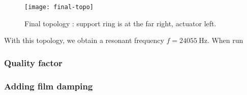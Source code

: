 \begin{figure}[h]
  \begin{center}
    \texttt{[image: final-topo]}
  \end{center}
  \caption{Final topology : support ring is at the far right, actuator left.}
  \label{fig:final-overview}
\end{figure}


With this topology, we obtain a resonant frequency $f = \SI{24055}{\hertz}$.
When run 

\subsubsection{Quality factor}
\subsubsection{Adding film damping}
